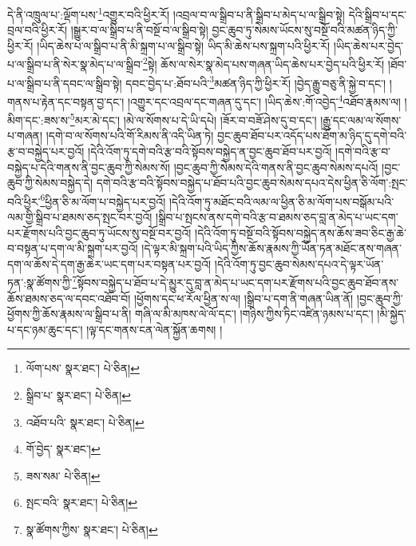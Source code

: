 དེ་ནི་འཁྲུལ་པ་:ལྡོག་པས་\footnote{ལོག་པས་  སྣར་ཐང་།  པེ་ཅིན། }འགྱུར་བའི་ཕྱིར་རོ། །འབྲལ་བ་ལ་སྒྲིབ་པ་ནི་སྒྲིབ་པ་མེད་པ་ལ་སྒྲིབ་སྟེ། དེའི་སྒྲིབ་པ་དང་བྲལ་བའི་ཕྱིར་རོ། །སྒྱུར་བ་ལ་སྒྲིབ་པ་ནི་བསྔོ་བ་ལ་སྒྲིབ་སྟེ། བྱང་ཆུབ་ཏུ་སེམས་ཡོངས་སུ་བསྔོ་བའི་མཚན་ཉིད་ཀྱི་ཕྱིར་རོ། །ཡིད་ཆེས་པ་ལ་སྒྲིབ་པ་ནི་མི་སྐྲག་པ་ལ་སྒྲིབ་སྟེ། ཡིད་མི་ཆེས་པས་སྐྲག་པའི་ཕྱིར་རོ། །ཡིད་ཆེས་པར་བྱེད་པ་ལ་སྒྲིབ་པ་ནི་སེར་སྣ་མེད་པ་ལ་སྒྲིབ་\footnote{སྒྲིབ་པ་  སྣར་ཐང་།  པེ་ཅིན། }སྟེ། ཆོས་ལ་སེར་སྣ་མེད་པས་གཞན་ཡིད་ཆེས་པར་བྱེད་པའི་ཕྱིར་རོ། །ཐོབ་པ་ལ་སྒྲིབ་པ་ནི་དབང་ལ་སྒྲིབ་སྟེ། དབང་བྱེད་པ་:ཐོབ་པའི་\footnote{འཐོབ་པའི་  སྣར་ཐང་།  པེ་ཅིན། }མཚན་ཉིད་ཀྱི་ཕྱིར་རོ། །བྱེད་རྒྱུ་བཅུ་ནི་སྐྱེ་བ་དང་། །གནས་པ་རྟེན་དང་བསྟན་བྱ་དང་། །འགྱུར་དང་འབྲལ་དང་གཞན་དུ་དང་། །ཡིད་ཆེས་:གོ་འབྱེད་\footnote{གོ་བྱེད་  སྣར་ཐང་། }འཐོབ་རྣམས་ལ། །མིག་དང་:ཟས་ས་\footnote{ཟས་སམ་  པེ་ཅིན། }མར་མེ་དང་། །མེ་ལ་སོགས་པ་དེ་ཡི་དཔེ། །ཟོར་བ་བཟོ་ཤེས་དུ་བ་དང་། །རྒྱུ་དང་ལམ་ལ་སོགས་པ་གཞན། །དགེ་བ་ལ་སོགས་པའི་གོ་རིམས་ནི་འདི་ཡིན་ཏེ། བྱང་ཆུབ་ཐོབ་པར་འདོད་པས་ཐོག་མ་ཉིད་དུ་དགེ་བའི་རྩ་བ་བསྐྱེད་པར་བྱའོ། །དེའི་འོག་ཏུ་དགེ་བའི་རྩ་བའི་སྟོབས་བསྐྱེད་ན་བྱང་ཆུབ་ཐོབ་པར་བྱའོ། །དགེ་བའི་རྩ་བ་བསྐྱེད་པ་དེའི་གནས་ནི་བྱང་ཆུབ་ཀྱི་སེམས་སོ། །བྱང་ཆུབ་ཀྱི་སེམས་དེའི་གནས་ནི་བྱང་ཆུབ་སེམས་དཔའོ། །བྱང་ཆུབ་ཀྱི་སེམས་བསྐྱེད་དེ། དགེ་བའི་རྩ་བའི་སྟོབས་བསྐྱེད་པ་ཐོབ་པའི་བྱང་ཆུབ་སེམས་དཔའ་དེས་ཕྱིན་ཅི་ལོག་:སྤང་བའི་ཕྱིར་\footnote{སྤང་བའི་  སྣར་ཐང་།  པེ་ཅིན། }ཕྱིན་ཅི་མ་ལོག་པ་བསྐྱེད་པར་བྱའོ། །དེའི་འོག་ཏུ་མཐོང་བའི་ལམ་ལ་ཕྱིན་ཅི་མ་ལོག་པས་བསྒོམ་པའི་ལམ་གྱི་སྒྲིབ་པ་ཐམས་ཅད་སྤང་བར་བྱའོ། །སྒྲིབ་པ་སྤངས་ནས་དགེ་བའི་རྩ་བ་ཐམས་ཅད་བླ་ན་མེད་པ་ཡང་དག་པར་རྫོགས་པའི་བྱང་ཆུབ་ཏུ་ཡོངས་སུ་བསྔོ་བར་བྱའོ། །དེའི་འོག་ཏུ་བསྔོ་བའི་སྟོབས་བསྐྱེད་ནས་ཆོས་ཟབ་ཅིང་རྒྱ་ཆེ་བ་བསྟན་པ་དག་ལ་མི་སྐྲག་པར་བྱའོ། །དེ་ལྟར་མི་སྐྲག་པའི་ཡིད་ཀྱིས་ཆོས་རྣམས་ཀྱི་ཡོན་ཏན་མཐོང་ནས་གཞན་དག་ལ་ཆོས་དེ་དག་རྒྱ་ཆེར་ཡང་དག་པར་བསྟན་པར་བྱའོ། །དེའི་འོག་ཏུ་བྱང་ཆུབ་སེམས་དཔའ་དེ་ལྟར་ཡོན་ཏན་:སྣ་ཚོགས་ཀྱི་\footnote{སྣ་ཚོགས་ཀྱིས་  སྣར་ཐང་།  པེ་ཅིན། }སྟོབས་བསྐྱེད་པ་ཐོབ་པ་དེ་མྱུར་དུ་བླ་ན་མེད་པ་ཡང་དག་པར་རྫོགས་པའི་བྱང་ཆུབ་ཐོབ་ནས་ཆོས་ཐམས་ཅད་ལ་དབང་འཐོབ་བོ། །ཕྱོགས་དང་ཕ་རོལ་ཕྱིན་ས་ལ། །སྒྲིབ་པ་དག་ནི་གཞན་ཡིན་ནོ། །བྱང་ཆུབ་ཀྱི་ཕྱོགས་ཀྱི་ཆོས་རྣམས་ལ་སྒྲིབ་པ་ནི། གཞི་ལ་མི་མཁས་ལེ་ལོ་དང་། །གཉིས་ཀྱིས་ཏིང་འཛིན་ཉམས་པ་དང་། །མི་སྐྱེད་པ་དང་ཉམ་ཆུང་དང་། །ལྟ་དང་གནས་ངན་ལེན་སྐྱོན་ཆགས། །
